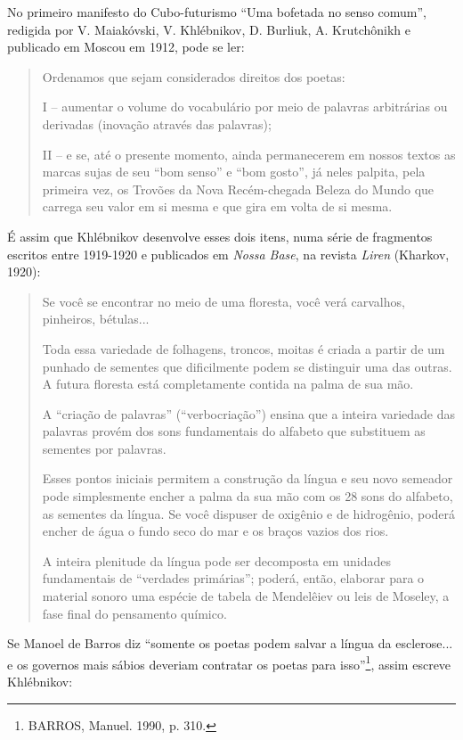 No primeiro manifesto do Cubo-futurismo ``Uma bofetada no senso comum'',
redigida por V. Maiakóvski, V. Khlébnikov, D. Burliuk, A. Krutchônikh e
publicado em Moscou em 1912, pode se ler:

\begin{quote}
Ordenamos que sejam considerados direitos dos poetas:

I -- aumentar o volume do vocabulário por meio de palavras arbitrárias
ou derivadas (inovação através das palavras);

II -- e se, até o presente momento, ainda permanecerem em nossos textos
as marcas sujas de seu ``bom senso'' e ``bom gosto'', já neles palpita,
pela primeira vez, os Trovões da Nova Recém-chegada Beleza do Mundo que
carrega seu valor em si mesma e que gira em volta de si mesma.
\end{quote}

É assim que Khlébnikov desenvolve esses dois itens, numa série de
fragmentos escritos entre 1919-1920 e publicados em \emph{Nossa Base},
na revista \emph{Liren} (Kharkov, 1920):

\begin{quote}
Se você se encontrar no meio de uma floresta, você verá carvalhos,
pinheiros, bétulas...

Toda essa variedade de folhagens, troncos, moitas é criada a partir de
um punhado de sementes que dificilmente podem se distinguir uma das
outras. A futura floresta está completamente contida na palma de sua
mão.

A ``criação de palavras'' (``verbocriação'') ensina que a inteira
variedade das palavras provém dos sons fundamentais do alfabeto que
substituem as sementes por palavras.

Esses pontos iniciais permitem a construção da língua e seu novo
semeador pode simplesmente encher a palma da sua mão com os 28 sons do
alfabeto, as sementes da língua. Se você dispuser de oxigênio e de
hidrogênio, poderá encher de água o fundo seco do mar e os braços vazios
dos rios.

A inteira plenitude da língua pode ser decomposta em unidades
fundamentais de ``verdades primárias''; poderá, então, elaborar para o
material sonoro uma espécie de tabela de Mendelêiev ou leis de Moseley,
a fase final do pensamento químico.
\end{quote}

Se Manoel de Barros diz ``somente os poetas podem salvar a língua da
esclerose... e os governos mais sábios deveriam contratar os poetas para
isso''\footnote{BARROS, Manuel. 1990, p. 310.}, assim escreve
Khlébnikov:

